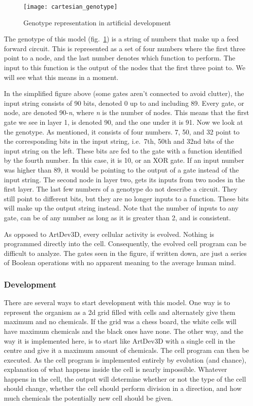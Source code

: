 \begin{figure}[!ht]
	\centering
	\texttt{[image: cartesian\_genotype]}
	\caption{Genotype representation in artificial development}
	\label{fig:cartesian_genotype}
\end{figure}

The genotype of this model (fig.~\ref{fig:cartesian_genotype}) is a string of numbers that make up a feed forward circuit. This is represented as a set of four numbers where the first three point to a node, and the last number denotes which function to perform. The input to this function is the output of the nodes that the first three point to. We will see what this means in a moment.

In the simplified figure above (some gates aren't connected to avoid clutter), the input string consists of 90 bits, denoted 0 up to and including 89. Every gate, or node, are denoted 90-\emph{n}, where \emph{n} is the number of nodes. This means that the first gate we see in layer 1, is denoted 90, and the one under it is 91. Now we look at the genotype. As mentioned, it consists of four numbers. 7, 50, and 32 point to the corresponding bits in the input string, i.e.\ 7th, 50th and 32nd bits of the input string on the left. These bits are fed to the gate with a function identified by the fourth number. In this case, it is 10, or an XOR gate. If an input number was higher than 89, it would be pointing to the output of a gate instead of the input string. The second node in layer two, gets its inputs from two nodes in the first layer. The last few numbers of a genotype do not describe a circuit. They still point to different bits, but they are no longer inputs to a function. These bits will make up the output string instead. Note that the number of inputs to any gate, can be of any number as long as it is greater than 2, and is consistent.

As opposed to ArtDev3D, every cellular activity is evolved. Nothing is programmed directly into the cell. Consequently, the evolved cell program can be difficult to analyze. The gates seen in the figure, if written down, are just a series of Boolean operations with no apparent meaning to the average human mind.

\subsubsection{Development}
There are several ways to start development with this model. One way is to represent the organism as a 2d grid filled with cells and alternately give them maximum and no chemicals. If the grid was a chess board, the white cells will have maximum chemicals and the black ones have none. The other way, and the way it is implemented here, is to start like ArtDev3D with a single cell in the centre and give it a maximum amount of chemicals. The cell program can then be executed. As the cell program is implemented entirely by evolution (and chance), explanation of what happens inside the cell is nearly impossible. Whatever happens in the cell, the output will determine whether or not the type of the cell should change, whether the cell should perform division in a direction, and how much chemicals the potentially new cell should be given.


